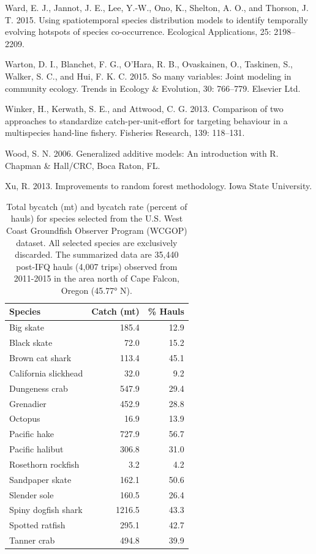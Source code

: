 \documentclass[]{article}
\begin{document}
\hypertarget{ref-ward2015}{}
Ward, E. J., Jannot, J. E., Lee, Y.-W., Ono, K., Shelton, A. O., and
Thorson, J. T. 2015. Using spatiotemporal species distribution models to
identify temporally evolving hotspots of species co-occurrence.
Ecological Applications, 25: 2198--2209.

\hypertarget{ref-warton2015}{}
Warton, D. I., Blanchet, F. G., O'Hara, R. B., Ovaskainen, O., Taskinen,
S., Walker, S. C., and Hui, F. K. C. 2015. So many variables: Joint
modeling in community ecology. Trends in Ecology \& Evolution, 30:
766--779. Elsevier Ltd.

\hypertarget{ref-winker2013a}{}
Winker, H., Kerwath, S. E., and Attwood, C. G. 2013. Comparison of two
approaches to standardize catch-per-unit-effort for targeting behaviour
in a multispecies hand-line fishery. Fisheries Research, 139: 118--131.

\hypertarget{ref-wood2006}{}
Wood, S. N. 2006. Generalized additive models: An introduction with R.
Chapman \& Hall/CRC, Boca Raton, FL.

\hypertarget{ref-xu2013}{}
Xu, R. 2013. Improvements to random forest methodology. Iowa State
University.

\pagebreak

\begin{table}

\caption{\label{tab:species-list}\label{tab:species-list}Total bycatch (mt) and bycatch rate (percent of hauls) for species selected from the U.S. West Coast Groundfish Observer Program (WCGOP) dataset. All selected species are exclusively discarded. The summarized data are 35,440 post-IFQ hauls (4,007 trips) observed from 2011-2015 in the area north of Cape Falcon, Oregon (45.77° N).}
\centering
\begin{tabular}[t]{lrr}
\toprule
Species & Catch (mt) & \% Hauls\\
\midrule
Big skate & 185.4 & 12.9\\
Black skate & 72.0 & 15.2\\
Brown cat shark & 113.4 & 45.1\\
California slickhead & 32.0 & 9.2\\
Dungeness crab & 547.9 & 29.4\\
\addlinespace
Grenadier & 452.9 & 28.8\\
Octopus & 16.9 & 13.9\\
Pacific hake & 727.9 & 56.7\\
Pacific halibut & 306.8 & 31.0\\
Rosethorn rockfish & 3.2 & 4.2\\
\addlinespace
Sandpaper skate & 162.1 & 50.6\\
Slender sole & 160.5 & 26.4\\
Spiny dogfish shark & 1216.5 & 43.3\\
Spotted ratfish & 295.1 & 42.7\\
Tanner crab & 494.8 & 39.9\\
\bottomrule
\end{tabular}
\end{table}
\end{document}
